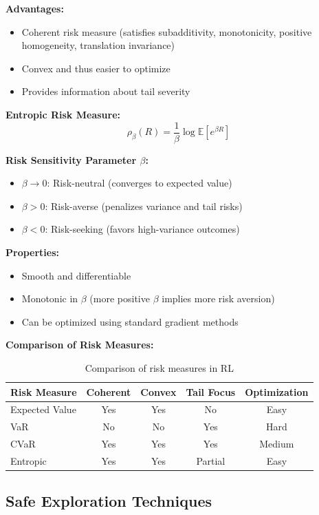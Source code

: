 \documentclass[12pt]{article}
\begin{document}
{{{{\textbf{Advantages:}
\begin{itemize}
\item Coherent risk measure (satisfies subadditivity, monotonicity, positive homogeneity, translation invariance)
\item Convex and thus easier to optimize
\item Provides information about tail severity
\end{itemize}

\textbf{Entropic Risk Measure:}
\begin{equation}
\rho_\beta(R) = \frac{1}{\beta} \log \mathbb{E}[e^{\beta R}]
\end{equation}

\textbf{Risk Sensitivity Parameter $\beta$:}
\begin{itemize}
\item $\beta \to 0$: Risk-neutral (converges to expected value)
\item $\beta > 0$: Risk-averse (penalizes variance and tail risks)
\item $\beta < 0$: Risk-seeking (favors high-variance outcomes)
\end{itemize}

\textbf{Properties:}
\begin{itemize}
\item Smooth and differentiable
\item Monotonic in $\beta$ (more positive $\beta$ implies more risk aversion)
\item Can be optimized using standard gradient methods
\end{itemize}

\textbf{Comparison of Risk Measures:}
\begin{table}[H]
\centering
\begin{tabular}{|l|c|c|c|c|}
\hline
\textbf{Risk Measure} & \textbf{Coherent} & \textbf{Convex} & \textbf{Tail Focus} & \textbf{Optimization} \\
\hline
Expected Value & Yes & Yes & No & Easy \\
VaR & No & No & Yes & Hard \\
CVaR & Yes & Yes & Yes & Medium \\
Entropic & Yes & Yes & Partial & Easy \\
\hline
\end{tabular}
\caption{Comparison of risk measures in RL}
\end{table}

\subsection{Safe Exploration Techniques}

}}}}
\end{document}
